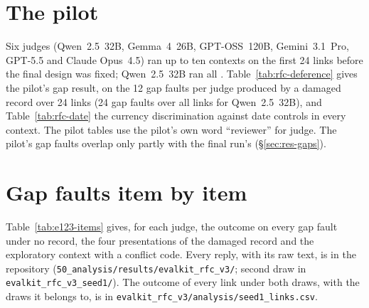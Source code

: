 
\renewcommand{\theHtable}{app\thesection.\arabic{table}}
\renewcommand{\theHfigure}{app\thesection.\arabic{figure}}
\section{The pilot}
\suppressfloats[t]
\label{app:pilot}
\label{app:study2}
\setcounter{table}{0}\setcounter{figure}{0}

Six judges (Qwen~2.5~32B, Gemma~4~26B, GPT-OSS~120B, Gemini~3.1~Pro, GPT-5.5 and Claude Opus~4.5) ran up to ten
contexts on the first 24 links before the final design was fixed; Qwen~2.5~32B ran all \RfcSample.
Table~\ref{tab:rfc-deference} gives the pilot's gap result, on the 12 gap faults per judge produced by a damaged
record over 24 links (24 gap faults over all \RfcSample{} links for Qwen~2.5~32B), and Table~\ref{tab:rfc-date} the currency discrimination against date controls in every
context. The pilot tables use the pilot's own word ``reviewer'' for judge. The pilot's gap faults overlap only partly with the final run's (\S\ref{sec:res-gaps}).




\section{Gap faults item by item}
\suppressfloats[t]
\label{app:items}
\setcounter{table}{0}\setcounter{figure}{0}
Table~\ref{tab:e123-items} gives, for each judge, the outcome on every gap fault under no record, the four
presentations of the damaged record and the exploratory context with a conflict code. Every reply, with its raw text,
is in the repository (\texttt{50\_analysis/results/evalkit\_rfc\_v3/}; second draw in \texttt{evalkit\_rfc\_v3\_seed1/}).
The outcome of every link under both draws, with the draws it belongs to, is in
\texttt{evalkit\_rfc\_v3/\allowbreak analysis/\allowbreak seed1\_links.csv}.

